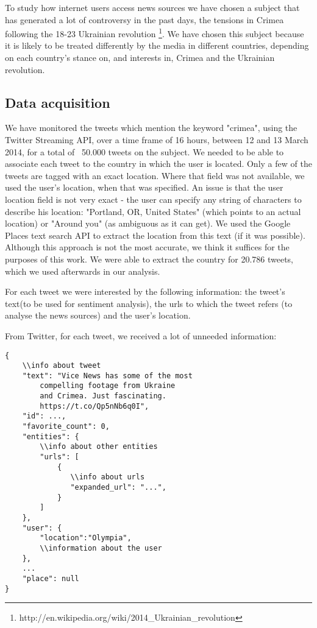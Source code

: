 \documentclass{acm_proc_10ptArticle-sp}
\begin{document}
To study how internet users access news sources we have chosen a subject that has generated a lot of controversy in the past days, the tensions in Crimea following the 18-23 Ukrainian revolution \footnote{http://en.wikipedia.org/wiki/2014\_Ukrainian\_revolution}. We have chosen this subject because it is likely to be treated differently by the media in different countries, depending on each country's stance on, and interests in, Crimea and the Ukrainian revolution.

\subsection{Data acquisition}

We have monitored the tweets which mention the keyword "crimea", using the Twitter Streaming API, over a time frame of 16 hours, between 12 and 13 March 2014, for a total of ~50.000 tweets on the subject. We needed to be able to associate each tweet to the country in which the user is located. Only a few of the tweets are tagged with an exact location. Where that field was not available, we used the user's location, when that was specified. An issue is that the user location field is not very exact - the user can specify any string of characters to describe his location: "Portland, OR, United States" (which points to an actual location) or "Around you" (as ambiguous as it can get). We used the Google Places text search API to extract the location from this text (if it was possible). Although this approach is not the most accurate, we think it suffices for the purposes of this work. We were able to extract the country for 20.786 tweets, which we used afterwards in our analysis.

For each tweet we were interested by the following information: the tweet's text(to be used for sentiment analysis), the urls to which the tweet refers (to analyse the news sources) and the user's location. 

From Twitter, for each tweet, we received a lot of unneeded information: 

\begin{verbatim}
{
    \\info about tweet
    "text": "Vice News has some of the most 
		compelling footage from Ukraine 
		and Crimea. Just fascinating. 
		https://t.co/Qp5nNb6q0I",
    "id": ...,
    "favorite_count": 0,
    "entities": {
        \\info about other entities
        "urls": [
            {
               \\info about urls
               "expanded_url": "...",
            }
        ]
    },
    "user": {
        "location":"Olympia",
        \\information about the user
    },
    ...
    "place": null
}
\end{verbatim}
\end{document}
